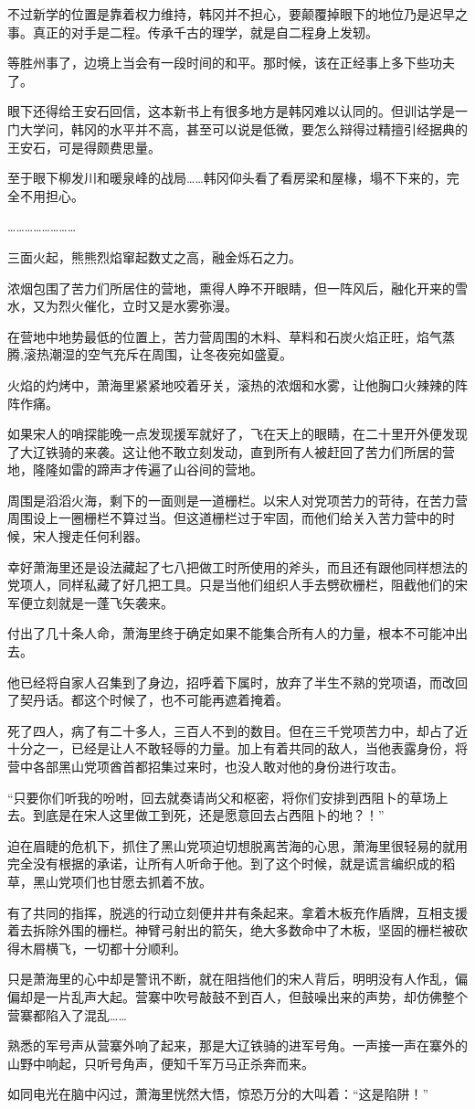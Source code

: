 不过新学的位置是靠着权力维持，韩冈并不担心，要颠覆掉眼下的地位乃是迟早之事。真正的对手是二程。传承千古的理学，就是自二程身上发轫。

等胜州事了，边境上当会有一段时间的和平。那时候，该在正经事上多下些功夫了。

眼下还得给王安石回信，这本新书上有很多地方是韩冈难以认同的。但训诂学是一门大学问，韩冈的水平并不高，甚至可以说是低微，要怎么辩得过精擅引经据典的王安石，可是得颇费思量。

至于眼下柳发川和暖泉峰的战局……韩冈仰头看了看房梁和屋椽，塌不下来的，完全不用担心。

……………………

三面火起，熊熊烈焰窜起数丈之高，融金烁石之力。

浓烟包围了苦力们所居住的营地，熏得人睁不开眼睛，但一阵风后，融化开来的雪水，又为烈火催化，立时又是水雾弥漫。

在营地中地势最低的位置上，苦力营周围的木料、草料和石炭火焰正旺，焰气蒸腾,滚热潮湿的空气充斥在周围，让冬夜宛如盛夏。

火焰的灼烤中，萧海里紧紧地咬着牙关，滚热的浓烟和水雾，让他胸口火辣辣的阵阵作痛。

如果宋人的哨探能晚一点发现援军就好了，飞在天上的眼睛，在二十里开外便发现了大辽铁骑的来袭。这让他不敢立刻发动，直到所有人被赶回了苦力们所居的营地，隆隆如雷的蹄声才传遍了山谷间的营地。

周围是滔滔火海，剩下的一面则是一道栅栏。以宋人对党项苦力的苛待，在苦力营周围设上一圈栅栏不算过当。但这道栅栏过于牢固，而他们给关入苦力营中的时候，宋人搜走任何利器。

幸好萧海里还是设法藏起了七八把做工时所使用的斧头，而且还有跟他同样想法的党项人，同样私藏了好几把工具。只是当他们组织人手去劈砍栅栏，阻截他们的宋军便立刻就是一蓬飞矢袭来。

付出了几十条人命，萧海里终于确定如果不能集合所有人的力量，根本不可能冲出去。

他已经将自家人召集到了身边，招呼着下属时，放弃了半生不熟的党项语，而改回了契丹话。都这个时候了，也不可能再遮着掩着。

死了四人，病了有二十多人，三百人不到的数目。但在三千党项苦力中，却占了近十分之一，已经是让人不敢轻辱的力量。加上有着共同的敌人，当他表露身份，将营中各部黑山党项酋首都招集过来时，也没人敢对他的身份进行攻击。

“只要你们听我的吩咐，回去就奏请尚父和枢密，将你们安排到西阻卜的草场上去。到底是在宋人这里做工到死，还是愿意回去占西阻卜的地？！”

迫在眉睫的危机下，抓住了黑山党项迫切想脱离苦海的心思，萧海里很轻易的就用完全没有根据的承诺，让所有人听命于他。到了这个时候，就是谎言编织成的稻草，黑山党项们也甘愿去抓着不放。

有了共同的指挥，脱逃的行动立刻便井井有条起来。拿着木板充作盾牌，互相支援着去拆除外围的栅栏。神臂弓射出的箭矢，绝大多数命中了木板，坚固的栅栏被砍得木屑横飞，一切都十分顺利。

只是萧海里的心中却是警讯不断，就在阻挡他们的宋人背后，明明没有人作乱，偏偏却是一片乱声大起。营寨中吹号敲鼓不到百人，但鼓噪出来的声势，却仿佛整个营寨都陷入了混乱……

熟悉的军号声从营寨外响了起来，那是大辽铁骑的进军号角。一声接一声在寨外的山野中响起，只听号角声，便知千军万马正杀奔而来。

如同电光在脑中闪过，萧海里恍然大悟，惊恐万分的大叫着：“这是陷阱！”


